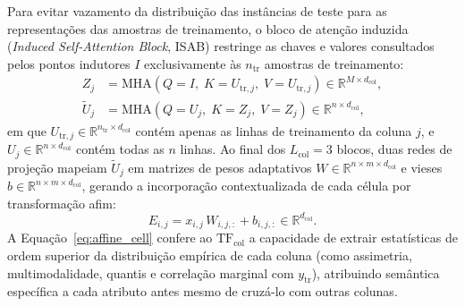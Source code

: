 \documentclass[11pt,a4paper]{article}
\begin{document}
Para evitar vazamento da distribuição das instâncias de teste para as representações das amostras de treinamento, o bloco de atenção induzida (\emph{Induced Self-Attention Block}, ISAB) restringe as chaves e valores consultados pelos pontos indutores $I$ exclusivamente às $n_{\mathrm{tr}}$ amostras de treinamento:
\begin{align}
    Z_j &= \mathrm{MHA}\!\left(Q = I, \; K = U_{\mathrm{tr}, j}, \; V = U_{\mathrm{tr}, j}\right) \in \mathbb{R}^{M \times d_{\mathrm{col}}}, \label{eq:isab_train} \\
    \tilde{U}_j &= \mathrm{MHA}\!\left(Q = U_j, \; K = Z_j, \; V = Z_j\right) \in \mathbb{R}^{n \times d_{\mathrm{col}}}, \label{eq:isab_all}
\end{align}
em que $U_{\mathrm{tr}, j} \in \mathbb{R}^{n_{\mathrm{tr}} \times d_{\mathrm{col}}}$ contém apenas as linhas de treinamento da coluna $j$, e $U_j \in \mathbb{R}^{n \times d_{\mathrm{col}}}$ contém todas as $n$ linhas. Ao final dos $L_{\mathrm{col}} = 3$ blocos, duas redes de projeção mapeiam $\tilde{U}_j$ em matrizes de pesos adaptativos $W \in \mathbb{R}^{n \times m \times d_{\mathrm{col}}}$ e vieses $b \in \mathbb{R}^{n \times m \times d_{\mathrm{col}}}$, gerando a incorporação contextualizada de cada célula por transformação afim:
\begin{equation}
    E_{i,j} = x_{i,j} \, W_{i,j,:} + b_{i,j,:} \in \mathbb{R}^{d_{\mathrm{col}}}.
    \label{eq:affine_cell}
\end{equation}
A Equação~\eqref{eq:affine_cell} confere ao $\mathrm{TF}_{\mathrm{col}}$ a capacidade de extrair estatísticas de ordem superior da distribuição empírica de cada coluna (como assimetria, multimodalidade, quantis e correlação marginal com $y_{\mathrm{tr}}$), atribuindo semântica específica a cada atributo antes mesmo de cruzá-lo com outras colunas.
\end{document}
